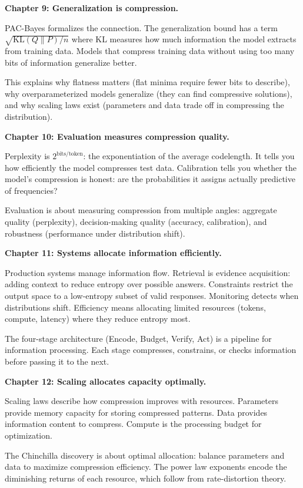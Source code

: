 \textbf{Chapter 9: Generalization is compression.}

PAC-Bayes formalizes the connection. The generalization bound has a term $\sqrt{\text{KL}(Q \| P) / n}$ where KL measures how much information the model extracts from training data. Models that compress training data without using too many bits of information generalize better.

This explains why flatness matters (flat minima require fewer bits to describe), why overparameterized models generalize (they can find compressive solutions), and why scaling laws exist (parameters and data trade off in compressing the distribution).

\textbf{Chapter 10: Evaluation measures compression quality.}

Perplexity is $2^{\text{bits/token}}$: the exponentiation of the average codelength. It tells you how efficiently the model compresses test data. Calibration tells you whether the model's compression is honest: are the probabilities it assigns actually predictive of frequencies?

Evaluation is about measuring compression from multiple angles: aggregate quality (perplexity), decision-making quality (accuracy, calibration), and robustness (performance under distribution shift).

\textbf{Chapter 11: Systems allocate information efficiently.}

Production systems manage information flow. Retrieval is evidence acquisition: adding context to reduce entropy over possible answers. Constraints restrict the output space to a low-entropy subset of valid responses. Monitoring detects when distributions shift. Efficiency means allocating limited resources (tokens, compute, latency) where they reduce entropy most.

The four-stage architecture (Encode, Budget, Verify, Act) is a pipeline for information processing. Each stage compresses, constrains, or checks information before passing it to the next.

\textbf{Chapter 12: Scaling allocates capacity optimally.}

Scaling laws describe how compression improves with resources. Parameters provide memory capacity for storing compressed patterns. Data provides information content to compress. Compute is the processing budget for optimization.

The Chinchilla discovery is about optimal allocation: balance parameters and data to maximize compression efficiency. The power law exponents encode the diminishing returns of each resource, which follow from rate-distortion theory.

